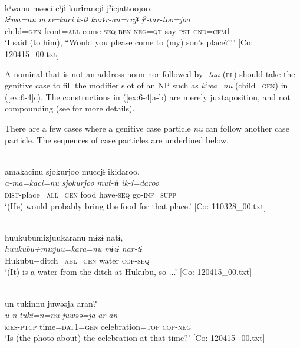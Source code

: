 \ex{}\\
{\TM}
\glll  kˀwanu  məəci  cˀjɨ  kurɨrancjɨ  jˀicjattoojoo.\\
\textit{kˀwa=nu}  \textit{məə=kaci}  \textit{k-tɨ}  \textit{kurɨr-an=ccjɨ}  \textit{jˀ-tar-too=joo}\\
child=\textsc{gen}  front=\textsc{all}  come-\textsc{seq}  \textsc{ben}-\textsc{neg}=\textsc{qt}  say-\textsc{pst}-\textsc{cnd}=\textsc{cfm}1\\
\glt ‘I said (to him), “Would you please come to (my) son’s place?”’ [Co: 120415\_00.txt]
\z

A nominal that is not an address noun nor followed by \textit{-taa} (\textsc{pl}) should take the genitive case to fill the modifier slot of an NP such as \textit{kˀwa=nu} (child=\textsc{gen}) in (\ref{ex:6-4}c). The constructions in (\ref{ex:6-4}a-b) are merely juxtaposition, and not compounding (see  for more details).

There are a few cases where a genitive case particle \textit{nu} can follow another case particle. The sequences of case particles are underlined below.

\ea\label{ex:6-5}
\ea{}\\
{\TM}
\glll  amakacinu  {\textbar}sjokurjoo{\textbar}  muccjɨ  ikidaroo.\\
\textit{a-ma=kaci=nu}  \textit{sjokurjoo}  \textit{mut-tɨ}  \textit{ik-i=daroo}\\
\textsc{dist}-place=\textsc{all}=\textsc{gen}  food  have-\textsc{seq}  go-\textsc{inf}=\textsc{supp}\\
\glt ‘(He) would probably bring the food for that place.’ [Co: 110328\_00.txt]
\z

\ex{}\\
{\TM}
\glll  huukubumizjuukaranu  mɨzɨ  natɨ,\\
\textit{huukubu+mizjuu=kara=nu}  \textit{mɨzɨ}  \textit{nar-tɨ}\\
Hukubu+ditch=\textsc{abl}=\textsc{gen}  water  \textsc{cop}-\textsc{seq}\\
\glt ‘(It) is a water from the ditch at Hukubu, so ...’ [Co: 120415\_00.txt]
\z

\ex{}\\
{\TM}
\glll  un  tukinnu  juwəəja  aran?\\
\textit{u-n}  \textit{tuki=n=nu}  \textit{juwəə=ja}  \textit{ar-an}\\
\textsc{mes}-\textsc{ptcp}  time=\textsc{dat}1=\textsc{gen}  celebration=\textsc{top}  \textsc{cop}-\textsc{neg}\\
\glt ‘Is (the photo about) the celebration at that time?’ [Co: 120415\_00.txt]
\z

